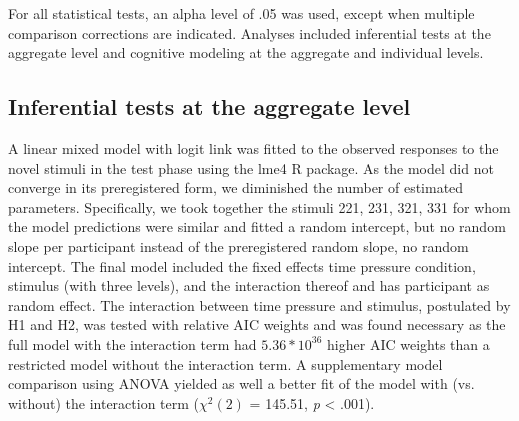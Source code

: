 \documentclass[a4paper,man,natbib]{apa6}
\begin{document}
For all statistical tests, an alpha level of .05 was used, except when multiple comparison corrections are indicated. Analyses included inferential tests at the aggregate level and cognitive modeling at the aggregate and individual levels.

\subsection{Inferential tests at the aggregate level}
A linear mixed model with logit link was fitted to the observed responses to the novel stimuli in the test phase using the lme4 R package. As the model did not converge in its preregistered form, we diminished the number of estimated parameters. Specifically, we took together the stimuli 221, 231, 321, 331 for whom the model predictions were similar and fitted a random intercept, but no random slope per participant instead of the preregistered random slope, no random intercept. The final model included the fixed effects time pressure condition, stimulus (with three levels), and the interaction thereof and has participant as random effect. The interaction between time pressure and stimulus, postulated by H1 and H2, was tested with relative AIC weights \citep[][p. 194]{wagenmakers2004aic} and was found necessary as the full model with the interaction term had $5.36 * 10^{36}$ higher AIC weights than a restricted model without the interaction term. A supplementary model comparison using ANOVA yielded as well a better fit of the model with (vs. without) the interaction term ($\chi^{2}(2)$ = 145.51, \textit{p} < .001). 
\end{document}
